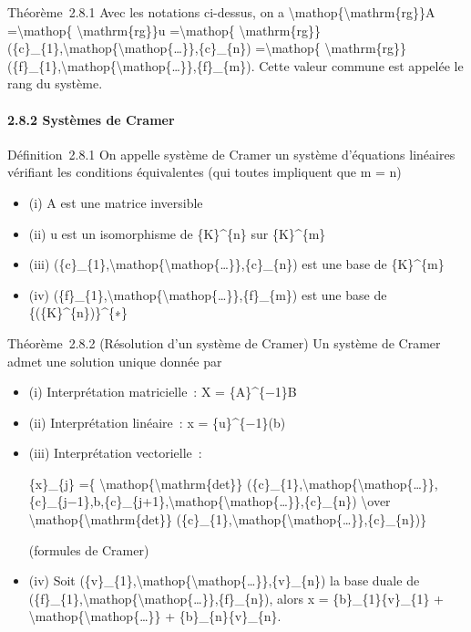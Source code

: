 \documentclass[]{article}
\begin{document}
Théorème~2.8.1 Avec les notations ci-dessus, on a
\textbackslash{}mathop\{\textbackslash{}mathrm\{rg\}\}A
=\textbackslash{}mathop\{ \textbackslash{}mathrm\{rg\}\}u
=\textbackslash{}mathop\{
\textbackslash{}mathrm\{rg\}\}(\{c\}\_\{1\},\textbackslash{}mathop\{\textbackslash{}mathop\{\ldots{}\}\},\{c\}\_\{n\})
=\textbackslash{}mathop\{
\textbackslash{}mathrm\{rg\}\}(\{f\}\_\{1\},\textbackslash{}mathop\{\textbackslash{}mathop\{\ldots{}\}\},\{f\}\_\{m\}).
Cette valeur commune est appelée le rang du système.

\paragraph{2.8.2 Systèmes de Cramer}

Définition~2.8.1 On appelle système de Cramer un système d'équations
linéaires vérifiant les conditions équivalentes (qui toutes impliquent
que m = n)

\begin{itemize}
\itemsep1pt\parskip0pt
\item
  (i) A est une matrice inversible
\item
  (ii) u est un isomorphisme de \{K\}\^{}\{n\} sur \{K\}\^{}\{m\}
\item
  (iii)
  (\{c\}\_\{1\},\textbackslash{}mathop\{\textbackslash{}mathop\{\ldots{}\}\},\{c\}\_\{n\})
  est une base de \{K\}\^{}\{m\}
\item
  (iv)
  (\{f\}\_\{1\},\textbackslash{}mathop\{\textbackslash{}mathop\{\ldots{}\}\},\{f\}\_\{m\})
  est une base de \{(\{K\}\^{}\{n\})\}\^{}\{∗\}
\end{itemize}

Théorème~2.8.2 (Résolution d'un système de Cramer) Un système de Cramer
admet une solution unique donnée par

\begin{itemize}
\item
  (i) Interprétation matricielle~: X = \{A\}\^{}\{−1\}B
\item
  (ii) Interprétation linéaire~: x = \{u\}\^{}\{−1\}(b)
\item
  (iii) Interprétation vectorielle~:

  \{x\}\_\{j\} =\{
  \textbackslash{}mathop\{\textbackslash{}mathrm\{det\}\}
  (\{c\}\_\{1\},\textbackslash{}mathop\{\textbackslash{}mathop\{\ldots{}\}\},\{c\}\_\{j−1\},b,\{c\}\_\{j+1\},\textbackslash{}mathop\{\textbackslash{}mathop\{\ldots{}\}\},\{c\}\_\{n\})
  \textbackslash{}over
  \textbackslash{}mathop\{\textbackslash{}mathrm\{det\}\}
  (\{c\}\_\{1\},\textbackslash{}mathop\{\textbackslash{}mathop\{\ldots{}\}\},\{c\}\_\{n\})\}

  (formules de Cramer)
\item
  (iv) Soit
  (\{v\}\_\{1\},\textbackslash{}mathop\{\textbackslash{}mathop\{\ldots{}\}\},\{v\}\_\{n\})
  la base duale de
  (\{f\}\_\{1\},\textbackslash{}mathop\{\textbackslash{}mathop\{\ldots{}\}\},\{f\}\_\{n\}),
  alors x = \{b\}\_\{1\}\{v\}\_\{1\} +
  \textbackslash{}mathop\{\textbackslash{}mathop\{\ldots{}\}\} +
  \{b\}\_\{n\}\{v\}\_\{n\}.
\end{itemize}
\end{document}
